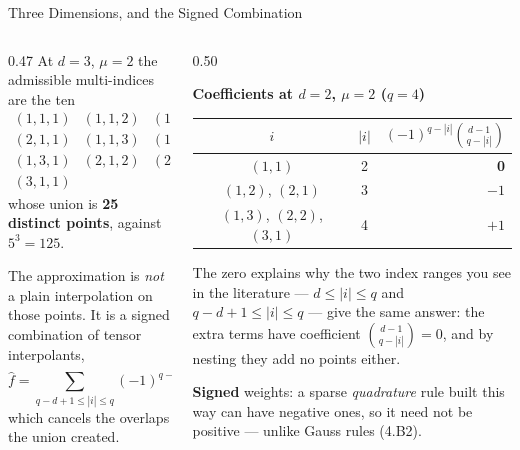 \begin{frame}{Three Dimensions, and the Signed Combination}
\begin{columns}[T]
\begin{column}{0.47\textwidth}
\small
At $d=3$, $\mu=2$ the admissible multi-indices are the ten
\[
\begin{array}{lll}
(1,1,1) & (1,1,2) & (1,2,1)\\
(2,1,1) & (1,1,3) & (1,2,2)\\
(1,3,1) & (2,1,2) & (2,2,1)\\
(3,1,1) & &
\end{array}
\]
whose union is \textbf{25 distinct points}, against $5^{3}=125$.
\medskip

The approximation is \emph{not} a plain interpolation on those points. It is a signed combination of tensor interpolants,
\[
  \hat f=\!\!\sum_{q-d+1\le|i|\le q}\!\!(-1)^{q-|i|}\binom{d-1}{q-|i|}\,
  \big(U^{i_1}\!\otimes\cdots\otimes U^{i_d}\big),
\]
which cancels the overlaps the union created.
\end{column}
\begin{column}{0.50\textwidth}
\begin{center}\footnotesize
\textbf{Coefficients at $d=2$, $\mu=2$ ($q=4$)}\\[1mm]
\begin{tabularx}{\linewidth}{@{}c c r@{}}
\toprule
$i$ & $|i|$ & $(-1)^{q-|i|}\binom{d-1}{q-|i|}$ \\
\midrule
$(1,1)$ & 2 & \textbf{0} \\
$(1,2)$, $(2,1)$ & 3 & $-1$ \\
$(1,3)$, $(2,2)$, $(3,1)$ & 4 & $+1$ \\
\bottomrule
\end{tabularx}
\end{center}
\vspace{1mm}
\begin{examplebox}\footnotesize
The zero explains why the two index ranges you see in the literature --- $d\le|i|\le q$ and $q-d+1\le|i|\le q$ --- give the same answer: the extra terms have coefficient $\binom{d-1}{q-|i|}=0$, and by nesting they add no points either.
\end{examplebox}
\vspace{-2mm}
\begin{cautionbox}\footnotesize
\textbf{Signed} weights: a sparse \emph{quadrature} rule built this way can have negative ones, so it need not be positive --- unlike Gauss rules (4.B2).
\end{cautionbox}
\end{column}
\end{columns}
\vspace{-1mm}
\end{frame}

